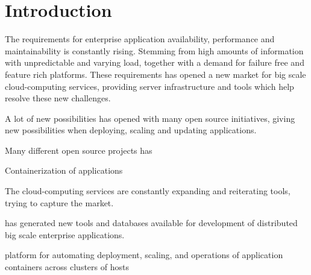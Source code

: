 \chapter{Introduction}
\label{ch:introduction}
The requirements for enterprise application availability, performance and maintainability is constantly rising. Stemming from high amounts of information with unpredictable and varying load, together with a demand for failure free and feature rich platforms. These requirements has opened a new market for big scale cloud-computing services, providing server infrastructure and tools which help resolve these new challenges.


A lot of new possibilities has opened with many open source initiatives, giving new possibilities when deploying, scaling and updating applications. 


Many different open source projects has 

Containerization of applications 

The cloud-computing services are constantly expanding and reiterating tools, trying to capture the market.

has generated new tools and databases available for development of distributed big scale enterprise applications.






platform for automating deployment, scaling, and operations of application containers across clusters of hosts